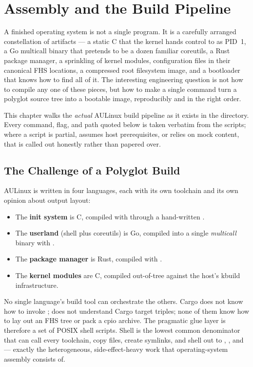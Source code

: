 \chapter{Assembly and the Build Pipeline}
\label{chap:build}

A finished operating system is not a single program. It is a carefully arranged
constellation of artifacts --- a static C  that the kernel hands
control to as PID~1, a Go multicall binary that pretends to be a dozen
familiar coreutils, a Rust package manager, a sprinkling of kernel modules,
configuration files in their canonical FHS locations, a compressed root
filesystem image, and a bootloader that knows how to find all of it. The
interesting engineering question is not how to compile any one of these
pieces, but how to make a single command turn a polyglot source tree into a
bootable image, reproducibly and in the right order.

This chapter walks the \emph{actual} AULinux build pipeline as it exists in
the  directory. Every command, flag, and path quoted below is
taken verbatim from the scripts; where a script is partial, assumes host
prerequisites, or relies on mock content, that is called out honestly rather
than papered over.

\section{The Challenge of a Polyglot Build}

AULinux is written in four languages, each with its own toolchain and its own
opinion about output layout:

\begin{itemize}
  \item The \textbf{init system} is C, compiled with  through a
        hand-written .
  \item The \textbf{userland} (shell plus coreutils) is Go, compiled into a
        single \emph{multicall} binary with .
  \item The \textbf{package manager} is Rust, compiled with
        .
  \item The \textbf{kernel modules} are C, compiled out-of-tree against the
        host's kbuild infrastructure.
\end{itemize}

No single language's build tool can orchestrate the others. Cargo does not
know how to invoke ;  does not understand Cargo
target triples; none of them know how to lay out an FHS tree or pack a cpio
archive. The pragmatic glue layer is therefore a set of POSIX shell scripts.
Shell is the lowest common denominator that can call every toolchain, copy
files, create symlinks, and shell out to , , and
 --- exactly the heterogeneous, side-effect-heavy work that
operating-system assembly consists of.

